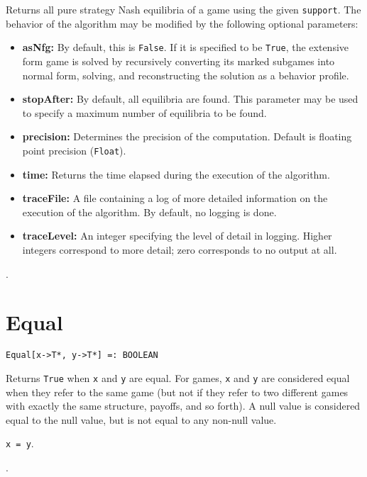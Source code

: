 \noindent
Returns all pure strategy Nash equilibria of a game using the given
\verb+support+.  The behavior
of the algorithm may be modified by the following optional parameters:
\begin{itemize}
\item
\textbf{asNfg:} By default, this is \verb+False+.  If it is specified to be
\verb+True+, the extensive form game is solved by recursively converting
its marked subgames into normal form, solving, and reconstructing the
solution as a behavior profile.
\item
\textbf{stopAfter:} By default, all equilibria are found.  This parameter may
be used to specify a maximum number of equilibria to be found.
\item
\textbf{precision:} Determines the precision of the computation. Default is
floating point precision (\verb+Float+). 
\item
\textbf{time:} Returns the time elapsed during the execution
of the algorithm.
\item
\textbf{traceFile:} A file containing a log of more detailed information on the
execution of the algorithm.  By default, no logging is done.
\item
\textbf{traceLevel:} An integer specifying the level of detail in logging.  Higher
integers correspond to more detail; zero corresponds to no output at all.
\end{itemize}

\seealso {}.


\section*{Equal}\label{PrimEqual}
\begin{verbatim}
Equal[x->T*, y->T*] =: BOOLEAN
\end{verbatim}
\foralltypes

\noindent
Returns \verb+True+ when \verb+x+ and \verb+y+ are equal.  For games,
\verb+x+ and \verb+y+ are considered equal when they refer to the same
game (but not if they refer to two different games with exactly the
same structure, payoffs, and so forth).  A null value is considered equal
to the null value, but is not equal to any non-null value.

\shortform \verb+x = y+.

\seealso {}.

